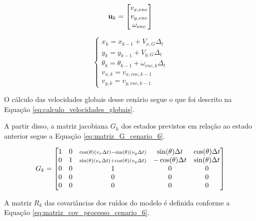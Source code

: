 \documentclass[acronym, symbols, table, deposito]{fei}
\begin{document}
			\begin{equation}\label{eq:entrada_predicao_encoders}
				\text{\textbf{u}}_k =
				\begin{bmatrix}
					v_{x,enc} \\
					v_{y,enc} \\
					\omega_{enc}
				\end{bmatrix}
			\end{equation}
		
			\begin{equation}\label{eq:predicao_cenario_6}
				\begin{cases}
					x_{k} = x_{k-1} + V_{x,G} \Delta_t \\
					y_{k} = y_{k-1} + V_{y,G} \Delta_t \\
					\theta_{k} = \theta_{k-1} + \omega_{enc,k} \Delta_t \\
					v_{x,k} = v_{x,enc,k-1} \\
					v_{y,k} = v_{y,enc,k-1}
				\end{cases}
			\end{equation}
			
			O cálculo das velocidades globais desse cenário segue o que foi descrito na Equação \eqref{eq:calculo_velocidades_globais}.
			
			A partir disso, a matriz jacobiana $G_{k}$ dos estados previstos em relação ao estado anterior segue a Equação \eqref{eq:matriz_G_cenario_6}.
			
			\renewcommand{\arraystretch}{1.2}
			\begin{equation}\label{eq:matriz_G_cenario_6}
				G_k = 
				\begin{bmatrix}
					1 & 0 & 
					\smash{\scriptstyle 
						\cos(\theta)\left( v_x \Delta t \right) 
						- \sin(\theta)\left( v_y \Delta t \right)} 
					& \sin(\theta) \Delta t 
					& \cos(\theta) \Delta t 
					\\
					0 & 1 & 
					\smash{\scriptstyle 
						\sin(\theta)\left( v_x \Delta t \right) 
						+ \cos(\theta)\left( v_y \Delta t \right)} 
					& -\cos(\theta) \Delta t 
					& \sin(\theta) \Delta t 
					\\
					0 & 0 & 1 & 0 & 0 \\
					0 & 0 & 0 & 0 & 0 \\
					0 & 0 & 0 & 0 & 0 \\
				\end{bmatrix}
			\end{equation}
		
			A matriz $R_k$ das covariâncias dos ruídos do modelo é definida conforme a Equação \eqref{eq:matriz_cov_processo_cenario_6}.
			
\end{document}
